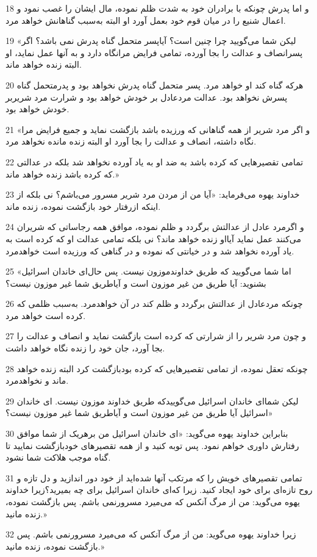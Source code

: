 \par 18 و اما پدرش چونکه با برادران خود به شدت ظلم نموده، مال ایشان را غصب نمود و اعمال شنیع را در میان قوم خود بعمل آورد او البته به‌سبب گناهانش خواهد مرد.
\par 19 «لیکن شما می‌گویید چرا چنین است؟ آیاپسر متحمل گناه پدرش نمی باشد؟ اگر پسرانصاف و عدالت را بجا آورده، تمامی فرایض مرانگاه دارد و به آنها عمل نماید، او البته زنده خواهد ماند.
\par 20 هر‌که گناه کند او خواهد مرد. پسر متحمل گناه پدرش نخواهد بود و پدرمتحمل گناه پسرش نخواهد بود. عدالت مردعادل بر خودش خواهد بود و شرارت مرد شریربر خودش خواهد بود.
\par 21 «و اگر مرد شریر از همه گناهانی که ورزیده باشد بازگشت نماید و جمیع فرایض مرا نگاه داشته، انصاف و عدالت را بجا آورد او البته زنده مانده نخواهد مرد.
\par 22 تمامی تقصیرهایی که کرده باشد به ضد او به یاد آورده نخواهد شد بلکه در عدالتی که کرده باشد زنده خواهد ماند.»
\par 23 خداوند یهوه می‌فرماید: «آیا من از مردن مرد شریر مسرور می‌باشم؟ نی بلکه از اینکه ازرفتار خود بازگشت نموده، زنده ماند.
\par 24 و اگرمرد عادل از عدالتش برگردد و ظلم نموده، موافق همه رجاساتی که شریران می‌کنند عمل نماید آیااو زنده خواهد ماند؟ نی بلکه تمامی عدالت او که کرده است به یاد آورده نخواهد شد و در خیانتی که نموده و در گناهی که ورزیده است خواهدمرد.
\par 25 «اما شما می‌گویید که طریق خداوندموزون نیست. پس حال‌ای خاندان اسرائیل بشنوید: آیا طریق من غیر موزون است و آیاطریق شما غیر موزون نیست؟
\par 26 چونکه مردعادل از عدالتش برگردد و ظلم کند در آن خواهدمرد. به‌سبب ظلمی که کرده است خواهد مرد.
\par 27 و چون مرد شریر را از شرارتی که کرده است بازگشت نماید و انصاف و عدالت را بجا آورد، جان خود را زنده نگاه خواهد داشت.
\par 28 چونکه تعقل نموده، از تمامی تقصیرهایی که کرده بودبازگشت کرد البته زنده خواهد ماند و نخواهدمرد.
\par 29 لیکن شما‌ای خاندان اسرائیل می‌گوییدکه طریق خداوند موزون نیست. ای خاندان اسرائیل آیا طریق من غیر موزون است و آیاطریق شما غیر موزون نیست؟»
\par 30 بنابراین خداوند یهوه می‌گوید: «ای خاندان اسرائیل من برهریک از شما موافق رفتارش داوری خواهم نمود. پس توبه کنید و از همه تقصیرهای خودبازگشت نمایید تا گناه موجب هلاکت شما نشود.
\par 31 تمامی تقصیرهای خویش را که مرتکب آنها شده‌اید از خود دور اندازید و دل تازه و روح تازه‌ای برای خود ایجاد کنید. زیرا که‌ای خاندان اسرائیل برای چه بمیرید؟زیرا خداوند یهوه می‌گوید: من از مرگ آنکس که می‌میرد مسرورنمی باشم. پس بازگشت نموده، زنده مانید.»
\par 32 زیرا خداوند یهوه می‌گوید: من از مرگ آنکس که می‌میرد مسرورنمی باشم. پس بازگشت نموده، زنده مانید.»

